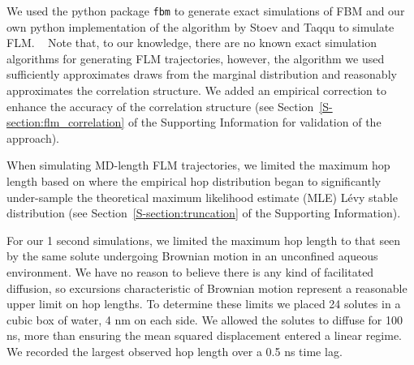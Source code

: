 \documentclass{article}
\begin{document}
  We used the python package \texttt{fbm} to generate exact simulations of FBM and our
  own python implementation of the algorithm by Stoev and Taqqu to simulate FLM.
  ~\cite{stoev_simulation_2004} Note that, to our knowledge, there are no known exact
  simulation algorithms for generating FLM trajectories, however, the algorithm
  we used sufficiently approximates draws from the marginal distribution and 
  reasonably approximates the correlation structure. We added an empirical correction
  to enhance the accuracy of the correlation structure (see Section~\ref{S-section:flm_correlation}
  of the Supporting Information for validation of the approach).
  


  When simulating MD-length FLM trajectories, we limited the maximum hop length based on where
  the empirical hop distribution began to significantly under-sample the theoretical
  maximum likelihood estimate (MLE) L\'evy stable distribution (see 
  Section~\ref{S-section:truncation} of the Supporting Information).

  For our 1 second simulations, we limited the maximum hop length to that seen by
  the same solute undergoing Brownian motion in an unconfined aqueous environment. 
  We have no reason to believe there is any kind of facilitated diffusion, so 
  excursions characteristic of Brownian motion represent a reasonable upper limit
  on hop lengths. To determine these limits we placed 24 solutes in a cubic box of 
  water, 4 nm on each side. We allowed the solutes to diffuse for 100 ns, more than
  ensuring the mean squared displacement entered a linear regime. We recorded the largest
  observed hop length over a 0.5 ns time lag. 
\end{document}
